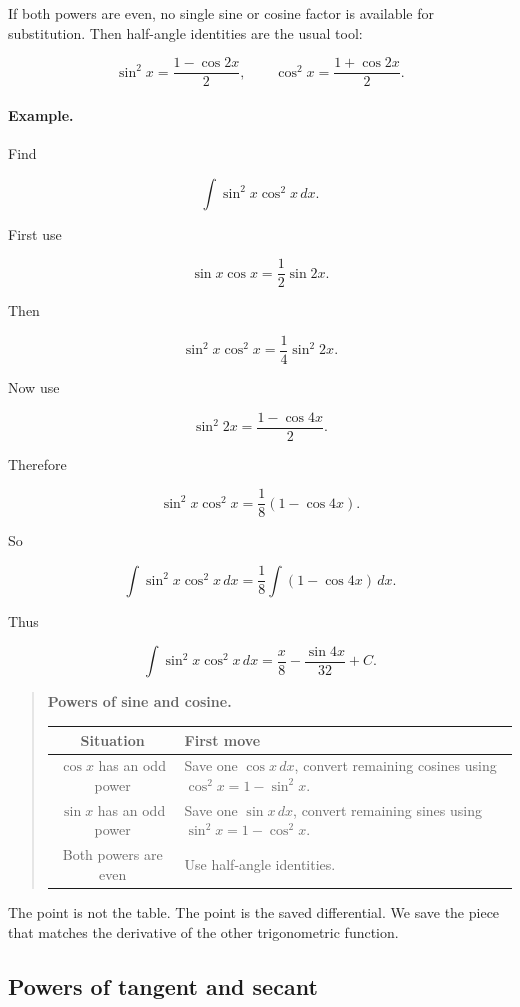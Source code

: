 If both powers are even, no single sine or cosine factor is available for substitution.
Then half-angle identities are the usual tool:

\[
\sin^2 x=\frac{1-\cos 2x}{2},
\qquad
\cos^2 x=\frac{1+\cos 2x}{2}.
\]

\paragraph{Example.}
Find

\[
\int \sin^2 x\cos^2 x\,dx.
\]

First use

\[
\sin x\cos x=\frac12\sin 2x.
\]

Then

\[
\sin^2 x\cos^2 x
=
\frac14\sin^2 2x.
\]

Now use

\[
\sin^2 2x=\frac{1-\cos 4x}{2}.
\]

Therefore

\[
\sin^2 x\cos^2 x
=
\frac18(1-\cos 4x).
\]

So

\[
\int \sin^2 x\cos^2 x\,dx
=
\frac18\int (1-\cos 4x)\,dx.
\]

Thus

\[
\boxed{
\int \sin^2 x\cos^2 x\,dx
=
\frac{x}{8}-\frac{\sin 4x}{32}+C.
}
\]

\begin{quote}
\textbf{Powers of sine and cosine.}

\begin{center}
\begin{tabular}{c|l}
\textbf{Situation} & \textbf{First move} \\ \hline
\(\cos x\) has an odd power & Save one \(\cos x\,dx\), convert remaining cosines using \(\cos^2x=1-\sin^2x\). \\[4pt]
\(\sin x\) has an odd power & Save one \(\sin x\,dx\), convert remaining sines using \(\sin^2x=1-\cos^2x\). \\[4pt]
Both powers are even & Use half-angle identities.
\end{tabular}
\end{center}
\end{quote}

The point is not the table.  The point is the saved differential.  We save the piece that
matches the derivative of the other trigonometric function.

\subsection{Powers of tangent and secant}
\label{subsec:powers-tangent-secant}


